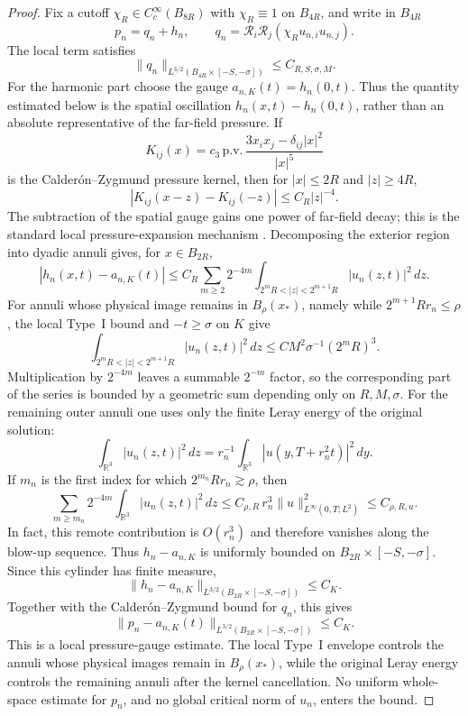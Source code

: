 \documentclass[11pt]{amsart}
\numberwithin{equation}{section}
\theoremstyle{plain}
\theoremstyle{definition}
\theoremstyle{remark}
\newcommand{\R}{\mathbb R}
\begin{document}
\begin{proof}
Fix a cutoff
\(\chi_R\in C_c^\infty(B_{8R})\) with \(\chi_R\equiv1\) on \(B_{4R}\), and
write in \(B_{4R}\)
\[
   p_n=q_n+h_n,\qquad
   q_n=\mathcal R_i\mathcal R_j(\chi_R u_{n,i}u_{n,j}).
\]
The local term satisfies
\[
   \|q_n\|_{L^{3/2}(B_{4R}\times[-S,-\sigma])}
   \le C_{R,S,\sigma,M}.
\]
For the harmonic part choose the gauge \(a_{n,K}(t)=h_n(0,t)\).  Thus the
quantity estimated below is the spatial oscillation
\(h_n(x,t)-h_n(0,t)\), rather than an absolute representative of the
far-field pressure.  If
\[
   K_{ij}(x)=c_3\,\mathrm{p.v.}\,
      \frac{3x_ix_j-\delta_{ij}|x|^2}{|x|^5}
\]
is the Calder\'on--Zygmund pressure kernel, then for \(|x|\le2R\) and
\(|z|\ge4R\),
\[
   |K_{ij}(x-z)-K_{ij}(-z)|\le C_R|z|^{-4}.
\]
The subtraction of the spatial gauge gains one power of far-field decay; this
is the standard local pressure-expansion mechanism
\cite{BradshawTsai2022}.
Decomposing the exterior region into dyadic annuli gives, for \(x\in B_{2R}\),
\[
   |h_n(x,t)-a_{n,K}(t)|
   \le
   C_R\sum_{m\ge2}2^{-4m}
   \int_{2^mR<|z|<2^{m+1}R}|u_n(z,t)|^2\,dz .
\]
For annuli whose physical image remains in \(B_\rho(x_*)\), namely while
\(2^{m+1}Rr_n\le\rho\), the local Type~I bound and \(-t\ge\sigma\) on \(K\)
give
\[
   \int_{2^mR<|z|<2^{m+1}R}|u_n(z,t)|^2\,dz
   \le C M^2\sigma^{-1}(2^mR)^3 .
\]
Multiplication by \(2^{-4m}\) leaves a summable \(2^{-m}\) factor, so the
corresponding part of the series is bounded by a geometric sum depending only
on \(R,M,\sigma\).  For the remaining outer annuli one uses only the finite
Leray energy of the original solution:
\[
   \int_{\R^3}|u_n(z,t)|^2\,dz
   =r_n^{-1}\int_{\R^3}|u(y,T+r_n^2t)|^2\,dy .
\]
If \(m_n\) is the first index for which \(2^{m_n}Rr_n\gtrsim\rho\), then
\[
   \sum_{m\ge m_n}2^{-4m}\int_{\R^3}|u_n(z,t)|^2\,dz
   \le
   C_{\rho,R}\,r_n^3\|u\|_{L^\infty(0,T;L^2)}^2
   \le C_{\rho,R,u}.
\]
In fact, this remote contribution is \(O(r_n^3)\) and therefore vanishes along
the blow-up sequence.  Thus \(h_n-a_{n,K}\) is uniformly bounded on
\(B_{2R}\times[-S,-\sigma]\).  Since this cylinder has finite measure,
\[
   \|h_n-a_{n,K}\|_{L^{3/2}(B_{2R}\times[-S,-\sigma])}
   \le C_K .
\]
Together with the Calder\'on--Zygmund bound for \(q_n\), this gives
\[
   \|p_n-a_{n,K}(t)\|_{L^{3/2}(B_{2R}\times[-S,-\sigma])}
   \le C_K .
\]
This is a local pressure-gauge estimate.  The local Type~I envelope controls
the annuli whose physical images remain in \(B_\rho(x_*)\), while the original
Leray energy controls the remaining annuli after the kernel cancellation.  No
uniform whole-space estimate for \(p_n\), and no global critical norm of
\(u_n\), enters the bound.


\end{proof}
\end{document}
